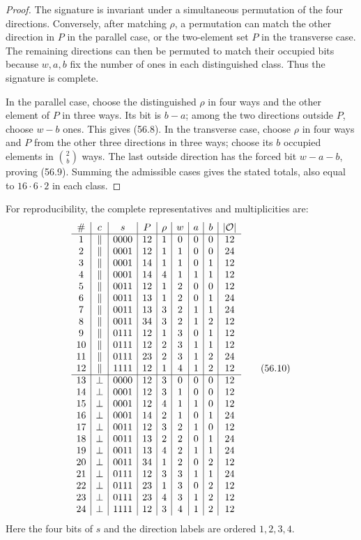 \documentclass[11pt,oneside]{book}
\theoremstyle{definition}
\theoremstyle{remark}
\begin{document}
\begin{proof}
The signature is invariant under a simultaneous permutation of
the four directions.  Conversely, after matching \(\rho\), a
permutation can match the other direction in \(P\) in the parallel
case, or the two-element set \(P\) in the transverse case.  The
remaining directions can then be permuted to match their occupied
bits because \(w,a,b\) fix the number of ones in each distinguished
class.  Thus the signature is complete.

In the parallel case, choose the distinguished \(\rho\) in four
ways and the other element of \(P\) in three ways.  Its bit is
\(b-a\); among the two directions outside \(P\), choose \(w-b\)
ones.  This gives (56.8).  In the transverse case, choose \(\rho\)
in four ways and \(P\) from the other three directions in three
ways; choose its \(b\) occupied elements in \(\binom2b\) ways.
The last outside direction has the forced bit \(w-a-b\), proving
(56.9).  Summing the admissible cases gives the stated totals,
also equal to
\(16\cdot6\cdot2\) in each class.
\end{proof}

For reproducibility, the complete representatives and
multiplicities are:
\[
\begin{array}{c|c|c|c|c|c|c|c|c}
\#&c&s&P&\rho&w&a&b&|{\cal O}|\\ \hline
1&\parallel&0000&12&1&0&0&0&12\\
2&\parallel&0001&12&1&1&0&0&24\\
3&\parallel&0001&14&1&1&0&1&12\\
4&\parallel&0001&14&4&1&1&1&12\\
5&\parallel&0011&12&1&2&0&0&12\\
6&\parallel&0011&13&1&2&0&1&24\\
7&\parallel&0011&13&3&2&1&1&24\\
8&\parallel&0011&34&3&2&1&2&12\\
9&\parallel&0111&12&1&3&0&1&12\\
10&\parallel&0111&12&2&3&1&1&12\\
11&\parallel&0111&23&2&3&1&2&24\\
12&\parallel&1111&12&1&4&1&2&12\\ \hline
13&\perp&0000&12&3&0&0&0&12\\
14&\perp&0001&12&3&1&0&0&12\\
15&\perp&0001&12&4&1&1&0&12\\
16&\perp&0001&14&2&1&0&1&24\\
17&\perp&0011&12&3&2&1&0&12\\
18&\perp&0011&13&2&2&0&1&24\\
19&\perp&0011&13&4&2&1&1&24\\
20&\perp&0011&34&1&2&0&2&12\\
21&\perp&0111&12&3&3&1&1&24\\
22&\perp&0111&23&1&3&0&2&12\\
23&\perp&0111&23&4&3&1&2&12\\
24&\perp&1111&12&3&4&1&2&12
\end{array}                                                    \tag{56.10}
\]
Here the four bits of \(s\) and the direction labels are ordered
\(1,2,3,4\).
\end{document}
